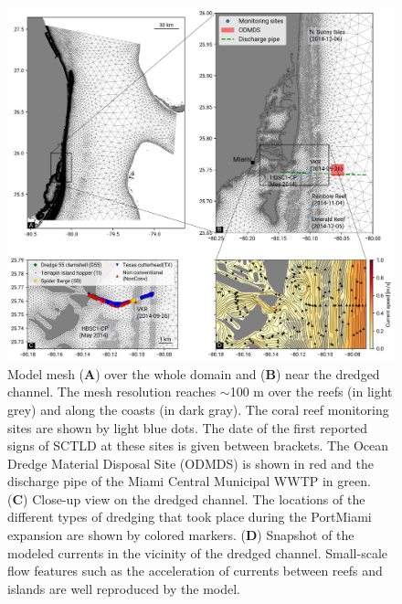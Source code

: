 \documentclass[preprint,12pt,authoryear]{elsarticle}
\begin{document}
\begin{figure}
	\centering
	\includegraphics[width=\textwidth]{figures/fig_mesh_new.png}
    \caption{Model mesh (\textbf{A}) over the whole domain and (\textbf{B}) near the dredged channel. The mesh resolution reaches $\sim$100 m over the reefs (in light grey) and along the coasts (in dark gray). The coral reef monitoring sites are shown by light blue dots. The date of the first reported signs of SCTLD at these sites is given between brackets. The Ocean Dredge Material Disposal Site (ODMDS) is shown in red and the discharge pipe of the Miami Central Municipal WWTP in green. (\textbf{C}) Close-up view on the dredged channel. The locations of the different types of dredging that took place during the PortMiami expansion are shown by colored markers. (\textbf{D}) Snapshot of the modeled currents in the vicinity of the dredged channel. Small-scale flow features such as the acceleration of currents between reefs and islands are well reproduced by the model.}
	\label{fig:onset_mesh}
\end{figure}
\end{document}
